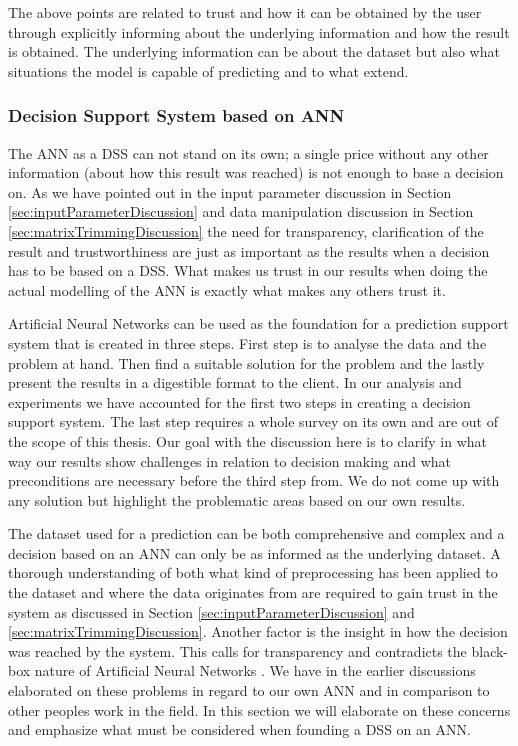 The above points are related to trust and how it can be obtained by the user through explicitly informing about the underlying information and how the result is obtained. The underlying information can be about the dataset but also what situations the model is capable of predicting and to what extend.

\subsubsection{Decision Support System based on ANN}
The ANN as a DSS can not stand on its own; a single price without any other information (about how this result was reached) is not enough to base a decision on. As we have pointed out in the input parameter discussion in Section \ref{sec:inputParameterDiscussion} and data manipulation discussion in Section \ref{sec:matrixTrimmingDiscussion} the need for transparency, clarification of the result and trustworthiness are just as important as the results when a decision has to be based on a DSS. What makes us trust in our results when doing the actual modelling of the ANN is exactly what makes any others trust it.

Artificial Neural Networks can be used as the foundation for a prediction support system that is created in three steps\cite{shim2002past}. First step is to analyse the data and the problem at hand. Then find a suitable solution for the problem and the lastly present the results in a digestible format to the client. In our analysis and experiments we have accounted for the first two steps in creating a decision support system. The last step requires a whole survey on its own and are out of the scope of this thesis. Our goal with the discussion here is to clarify in what way our results show challenges in relation to decision making and what preconditions are necessary before the third step from\cite{shim2002past}. We do not come up with any solution but highlight the problematic areas based on our own results. 

The dataset used for a prediction can be both comprehensive and complex and a decision based on an ANN can only be as informed as the underlying dataset. A thorough understanding of both what kind of preprocessing has been applied to the dataset and where the data originates from are required to gain trust in the system as discussed in Section \ref{sec:inputParameterDiscussion} and \ref{sec:matrixTrimmingDiscussion}. Another factor is the insight in how the decision was reached by the system. This calls for transparency and contradicts the black-box nature of Artificial Neural Networks \cite{fromBlackBoxToTransparentBox}. We have in the earlier discussions elaborated on these problems in regard to our own ANN and in comparison to other peoples work in the field. In this section we will elaborate on these concerns and emphasize what must be considered when founding a DSS on an ANN.

